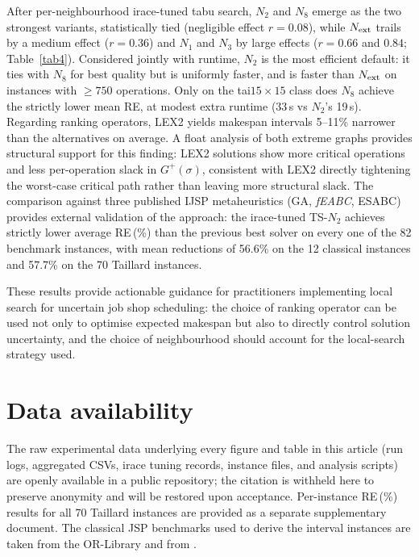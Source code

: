 \documentclass[preprint,12pt]{elsarticle}
\begin{document}
After per-neighbourhood irace-tuned tabu search, $N_2$ and $N_8$ emerge as the two strongest variants, statistically tied (negligible effect $r=0.08$), while $N_{\rm ext}$ trails by a medium effect ($r=0.36$) and $N_1$ and $N_3$ by large effects ($r=0.66$ and $0.84$; Table~\ref{tab4}). Considered jointly with runtime, $N_2$ is the most efficient default: it ties with $N_8$ for best quality but is uniformly faster, and is faster than $N_{\rm ext}$ on instances with $\geq 750$ operations. Only on the tai$15{\times}15$ class does $N_8$ achieve the strictly lower mean RE, at modest extra runtime (33\,s vs $N_2$'s 19\,s). Regarding ranking operators, LEX2 yields makespan intervals 5--11\% narrower than the alternatives on average. A float analysis of both extreme graphs provides structural support for this finding: LEX2 solutions show more critical operations and less per-operation slack in $G^+(\sigma)$, consistent with LEX2 directly tightening the worst-case critical path rather than leaving more structural slack. The comparison against three published IJSP metaheuristics (GA, \emph{fEABC}, ESABC) provides external validation of the approach: the irace-tuned TS-$N_2$ achieves strictly lower average RE\,(\%) than the previous best solver on every one of the 82 benchmark instances, with mean reductions of 56.6\% on the 12 classical instances and 57.7\% on the 70 Taillard instances.

These results provide actionable guidance for practitioners implementing local search for uncertain job shop scheduling: the choice of ranking operator can be used not only to optimise expected makespan but also to directly control solution uncertainty, and the choice of neighbourhood should account for the local-search strategy used.




\section*{Data availability}

The raw experimental data underlying every figure and table in this article (run logs, aggregated CSVs, irace tuning records, instance files, and analysis scripts) are openly available in a public repository; the citation is withheld here to preserve anonymity and will be restored upon acceptance. Per-instance RE\,(\%) results for all 70 Taillard instances are provided as a separate supplementary document. The classical JSP benchmarks used to derive the interval instances are taken from the OR-Library and from \cite{TaillardBKS}.





\end{document}
